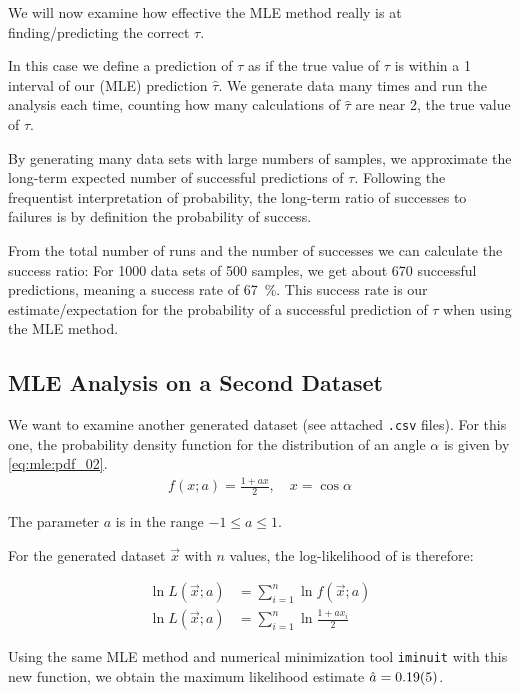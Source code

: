 We will now examine how effective the MLE method really is at finding/predicting the correct \( \tau \).

In this case we define a prediction of \( \tau \) as  if the true value of $\tau$ is within a \qty{1}{\sigma} interval of our (MLE) prediction $\hat{\tau}$. We generate data many times and run the analysis each time, counting how many calculations of \( \hat{\tau} \) are near \num{2}, the true value of \( \tau \).

By generating many data sets with large numbers of samples, we approximate the long-term expected number of successful predictions of $\tau$. Following the frequentist interpretation of probability, the long-term ratio of successes to failures is by definition the probability of success.

From the total number of runs and the number of successes we can calculate the success ratio: For \num{1000} data sets of \num{500} samples, we get about \num{670} successful predictions, meaning a success rate of \qty{67}{\percent}. This success rate is our estimate/expectation for the probability of a successful prediction of \( \tau \) when using the MLE method.


\subsection{MLE Analysis on a Second Dataset}

We want to examine another generated dataset (see attached \verb|.csv| files). For this one, the probability density function for the distribution of an angle $\alpha$ is given by \autoref{eq:mle:pdf_02}.
\begin{gather}
    f(x; a) = \frac{1 + a x}{2}, \quad x = \cos \alpha
    \label{eq:mle:pdf_02}
\end{gather}

The parameter $a$ is in the range $-1 \le a \le 1$.

For the generated dataset $\vec{x}$ with $n$ values, the log-likelihood of is therefore:

\begin{align}
    \ln L(\vec{x}; a) &= \sum \limits_{i=1}^{n} \ln f(\vec{x}; a) \\
    \ln L(\vec{x}; a) &= \sum \limits_{i=1}^{n} \ln \frac{1 + a x_i}{2}
\end{align}

Using the same MLE method and numerical minimization tool \texttt{iminuit} with this new function, we obtain the maximum likelihood estimate $\hat{a} = \num{0.19 \pm 0.05}$.

